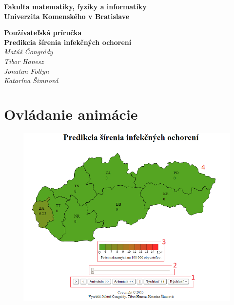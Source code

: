 \documentclass[12pt,a4paper]{report}
\begin{document}
	\begin{titlepage}
		\centering\bfseries
		Fakulta matematiky, fyziky a informatiky\\Univerzita Komenského v Bratislave	
		
		\fontsize{23}{28}\textbf{Používateľská príručka}\\
		\fontsize{16}{22}\textbf{Predikcia šírenia infekčných ochorení}\\
		\large\textit{Matúš Čongrády\\Tibor Hanesz\\Jonatan Foltyn\\Katarína Šimnová}
		
	\end{titlepage}\bigskip
	\setcounter{tocdepth}{9}
	\tableofcontents
\pagebreak

\renewcommand{\chaptername}{}	
\chapter[Ovládanie animácie]{\rmfamily\bfseries
	Ovládanie animácie}	

\begin{figure}[htb]
	\includegraphics[scale=0.8]{front}
	\label{fig:front-end}
\end{figure}
\end{document}
